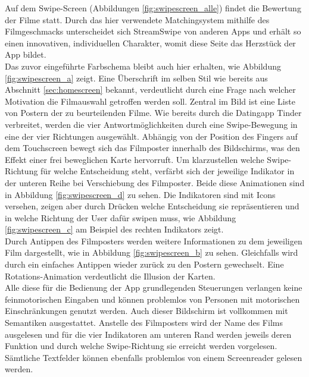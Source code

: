 Auf dem Swipe-Screen (Abbildungen \ref{fig:swipescreen_alle}) findet die Bewertung der Filme statt. Durch das hier verwendete Matchingsystem mithilfe des Filmgeschmacks unterscheidet sich StreamSwipe von anderen Apps und erhält so einen innovativen, individuellen Charakter, womit diese Seite das Herzstück der App bildet.\\
Das zuvor eingeführte Farbschema bleibt auch hier erhalten, wie Abbildung \ref{fig:swipescreen_a} zeigt. Eine Überschrift im selben Stil wie bereits aus Abschnitt \ref{sec:homescreen} bekannt, verdeutlicht durch eine Frage nach welcher Motivation die Filmauswahl getroffen werden soll. Zentral im Bild ist eine Liste von Postern der zu beurteilenden Filme. Wie bereits durch die Datingapp Tinder verbreitet, werden die vier Antwortmöglichkeiten durch eine Swipe-Bewegung in eine der vier Richtungen ausgewählt. Abhängig von der Position des Fingers auf dem Touchscreen bewegt sich das Filmposter innerhalb des Bildschirms, was den Effekt einer frei beweglichen Karte hervorruft. Um klarzustellen welche Swipe-Richtung für welche Entscheidung steht, verfärbt sich der jeweilige Indikator in der unteren Reihe bei Verschiebung des Filmposter. Beide diese Animationen sind in Abbildung \ref{fig:swipescreen_d} zu sehen. Die Indikatoren sind mit Icons versehen, zeigen aber durch Drücken welche Entscheidung sie repräsentieren und in welche Richtung der User dafür swipen muss, wie Abbildung \ref{fig:swipescreen_c} am Beispiel des rechten Indikators zeigt. \\
Durch Antippen des Filmposters werden weitere Informationen zu dem jeweiligen Film dargestellt, wie in Abbildung \ref{fig:swipescreen_b} zu sehen. Gleichfalls wird durch ein einfaches Antippen wieder zurück  zu den Postern gewechselt. Eine Rotations-Animation verdeutlicht die Illusion der Karten.\\
Alle diese für die Bedienung der App grundlegenden Steuerungen verlangen keine feinmotorischen Eingaben und können problemlos von Personen mit motorischen Einschränkungen genutzt werden. Auch dieser Bildschirm ist vollkommen mit Semantiken ausgestattet. Anstelle des Filmposters wird der Name des Films ausgelesen und für die vier Indikatoren am unteren Rand werden jeweils deren Funktion und durch welche Swipe-Richtung sie erreicht werden vorgelesen. Sämtliche Textfelder können ebenfalls problemlos von einem Screenreader gelesen werden.



